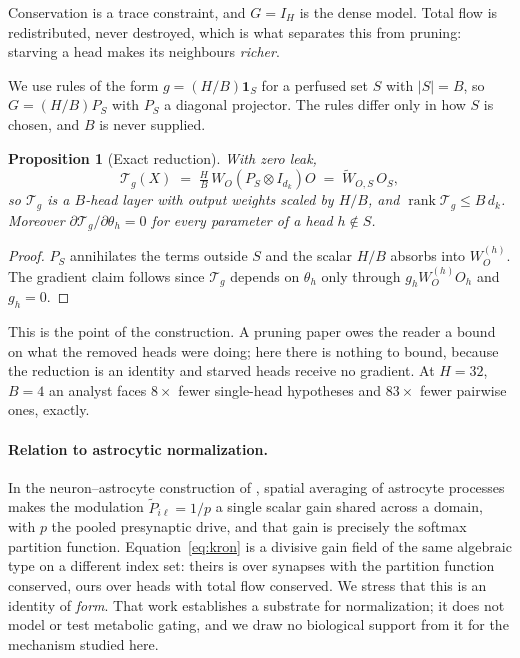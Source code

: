 \documentclass[10pt,twocolumn]{article}
\theoremstyle{plain}
\newtheorem{proposition}{Proposition}
\theoremstyle{definition}
\theoremstyle{remark}
\begin{document}
Conservation is a trace constraint, and $G = I_H$ is the dense model. Total flow is
redistributed, never destroyed, which is what separates this from pruning: starving a head
makes its neighbours \emph{richer}.

We use rules of the form $g = (H/B)\mathbf{1}_S$ for a perfused set $S$ with $|S| = B$, so
$G = (H/B) P_S$ with $P_S$ a diagonal projector. The rules differ only in how $S$ is
chosen, and $B$ is never supplied.

\begin{proposition}[Exact reduction]
\label{prop:reduction}
With zero leak,
\begin{equation}
  \mathcal{T}_g(X) \;=\; \tfrac{H}{B}\,W_O (P_S \otimes I_{d_k}) O
  \;=\; \widetilde{W}_{O,S}\,O_S ,
\end{equation}
so $\mathcal{T}_g$ \emph{is} a $B$-head layer with output weights scaled by $H/B$, and
$\operatorname{rank}\mathcal{T}_g \le B\,d_k$. Moreover
$\partial \mathcal{T}_g/\partial \theta_h = 0$ for every parameter of a head $h \notin S$.
\end{proposition}

\begin{proof}
$P_S$ annihilates the terms outside $S$ and the scalar $H/B$ absorbs into $W_O^{(h)}$.
The gradient claim follows since $\mathcal{T}_g$ depends on $\theta_h$ only through
$g_h W_O^{(h)} O_h$ and $g_h = 0$.
\end{proof}

This is the point of the construction. A pruning paper owes the reader a bound on what the
removed heads were doing; here there is nothing to bound, because the reduction is an
identity and starved heads receive no gradient. At $H{=}32$, $B{=}4$ an analyst faces
$8\times$ fewer single-head hypotheses and $83\times$ fewer pairwise ones, exactly.

\paragraph{Relation to astrocytic normalization.}
In the neuron--astrocyte construction of \cite{kozachkov2023}, spatial averaging of
astrocyte processes makes the modulation $\widetilde{P}_{i\ell} = 1/p$ a single scalar
gain shared across a domain, with $p$ the pooled presynaptic drive, and that gain is
precisely the softmax partition function. Equation~\eqref{eq:kron} is a divisive gain
field of the same algebraic type on a different index set: theirs is over synapses with
the partition function conserved, ours over heads with total flow conserved. We stress
that this is an identity of \emph{form}. That work establishes a substrate for
normalization; it does not model or test metabolic gating, and we draw no biological
support from it for the mechanism studied here.
\end{document}
